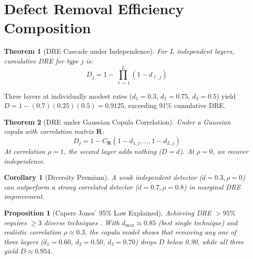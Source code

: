 \documentclass[11pt, a4paper, logo, copyright]{googledeepmind}
\newtheorem{theorem}{Theorem}[section]
\newtheorem{proposition}{Proposition}[section]
\newtheorem{corollary}{Corollary}[section]
\begin{document}
\section{Defect Removal Efficiency Composition}
\label{sec:dre}

\begin{theorem}[DRE Cascade under Independence]
\label{thm:drecascade}
For $L$ independent layers, cumulative DRE for type $j$ is:
\begin{equation}
D_j = 1 - \prod_{\ell=1}^{L} (1 - d_{\ell,j})
\end{equation}
\end{theorem}

Three layers at individually modest rates ($d_1 = 0.3$, $d_2 = 0.75$, $d_3 = 0.5$) yield $D = 1 - (0.7)(0.25)(0.5) = 0.9125$, exceeding 91\% cumulative DRE.

\begin{theorem}[DRE under Gaussian Copula Correlation]
\label{thm:copula}
Under a Gaussian copula \citep{sklar1959} with correlation matrix $\mathbf{R}$:
\begin{equation}
D_j = 1 - C_{\mathbf{R}}(1 - d_{1,j}, \ldots, 1 - d_{L,j})
\end{equation}
At correlation $\rho = 1$, the second layer adds nothing ($D = d$). At $\rho = 0$, we recover independence.
\end{theorem}

\begin{corollary}[Diversity Premium]
\label{cor:diversity}
A weak independent detector ($d = 0.3, \rho = 0$) can outperform a strong correlated detector ($d = 0.7, \rho = 0.8$) in marginal DRE improvement.
\end{corollary}

\begin{proposition}[Capers Jones' 95\% Law Explained]
\label{prop:jones}
Achieving DRE $> 95\%$ requires ${\geq}3$ diverse techniques \citep{capersjones2012}. With $d_{\max} \approx 0.85$ (best single technique) and realistic correlation $\rho \approx 0.3$, the copula model shows that removing any one of three layers ($d_1 = 0.60$, $d_2 = 0.50$, $d_3 = 0.70$) drops $D$ below 0.90, while all three yield $D \approx 0.954$.
\end{proposition}


\end{document}
